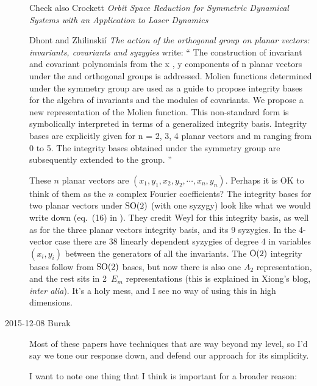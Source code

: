\begin{description}
Check also Crockett {\em Orbit Space Reduction for
Symmetric Dynamical Systems with an Application to Laser Dynamics}

Dhont and Zhilinski\'i
{\em The action of the orthogonal group on planar vectors:
         invariants, covariants and syzygies} write: ``
The construction of invariant and covariant polynomials from the x , y
components of n planar vectors under the  and  orthogonal groups
is addressed. Molien functions determined under the  symmetry group
are used as a guide to propose integrity bases for the algebra of
invariants and the modules of covariants. We propose a new representation
of the Molien function. This non-standard form is symbolically
interpreted in terms of a generalized integrity basis. Integrity bases
are explicitly given for n = 2, 3, 4 planar vectors and m ranging from 0
to 5. The integrity bases obtained under the  symmetry group are
subsequently extended to the  group.
''

These $n$ planar vectors are $(x_1,y_1,x_2,y_2,\cdots,x_n,y_n)$. Perhaps
it is OK to think of them as the $n$ complex Fourier coefficients? The
integrity bases for two planar vectors under $\textrm{SO}(2)$ (with one syzygy)
look like what we would write down (eq.~(16) in ). They
credit Weyl for this integrity basis, as well as for the three
planar vectors integrity basis, and its 9 syzygies. In the 4-vector
case there are 38  linearly dependent syzygies of degree 4 in variables
$(x_i, y_i)$ between the generators of all the invariants.
The  $\textrm{O}(2)$ integrity bases follow from  $\textrm{SO}(2)$ bases, but now
there is also one $A_2$ representation, and the rest sits in 2\dmn\ $E_m$
representations (this is explained in Xiong's blog, {\em inter alia}).
It's a holy mess, and I see no way of using this in high dimensions.

\item[2015-12-08 Burak] Most of these
papers have techniques that are way beyond my level, so I'd say we
tone our response down, and defend our approach for its simplicity.

I want to note one thing that I think is important for a broader
reason:


\end{description}

